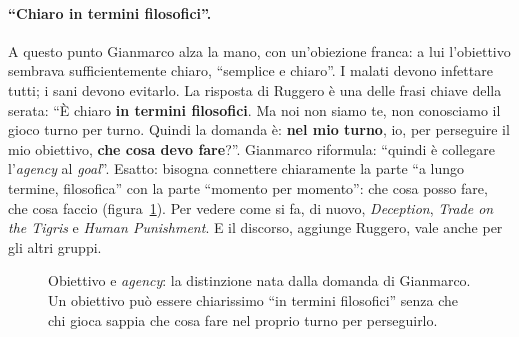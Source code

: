 \paragraph{``Chiaro in termini filosofici''.} A questo punto Gianmarco alza la mano, con
un'obiezione franca: a lui l'obiettivo sembrava sufficientemente chiaro, ``semplice e
chiaro''. I malati devono infettare tutti; i sani devono evitarlo. La risposta di
Ruggero è una delle frasi chiave della serata: ``È chiaro \textbf{in termini filosofici}.
Ma noi non siamo te, non conosciamo il gioco turno per turno. Quindi la domanda è:
\textbf{nel mio turno}, io, per perseguire il mio obiettivo, \textbf{che cosa devo
fare}?''. Gianmarco riformula: ``quindi è collegare l'\emph{agency} al \emph{goal}''.
Esatto: bisogna connettere chiaramente la parte ``a lungo termine, filosofica'' con la
parte ``momento per momento'': che cosa posso fare, che cosa faccio
(figura~\ref{a11:fig:goal}). Per vedere come si fa, di nuovo, \emph{Deception},
\emph{Trade on the Tigris} e \emph{Human Punishment}. E il discorso, aggiunge Ruggero,
vale anche per gli altri gruppi.

\begin{figure}[htbp]
\centering
{}
\caption{Obiettivo e \emph{agency}: la distinzione nata dalla domanda di Gianmarco. Un
obiettivo può essere chiarissimo ``in termini filosofici'' senza che chi gioca sappia
che cosa fare nel proprio turno per perseguirlo.}
\label{a11:fig:goal}
\end{figure}

